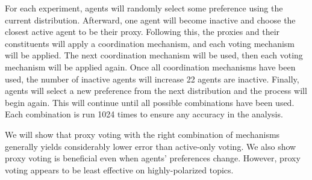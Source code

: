 For each experiment, agents will randomly select some preference using the current
distribution.
Afterward, one agent
will become inactive and choose the closest active agent to be their proxy.
Following this, the proxies and their constituents will apply a coordination
mechanism, and each voting mechanism will be applied.
The next coordination mechanism will be used, then each voting mechanism will be
applied again.
Once all coordination mechanisms have been used, the number of inactive agents will
increase 22 agents are inactive.
Finally, agents will select a new preference from the next distribution and the
process will begin again.
This will continue until all possible combinations have been used.
%
Each combination is run 1024 times to ensure any accuracy in the analysis.

We will show that proxy voting with the right combination of mechanisms generally
yields considerably lower error than active-only voting.
We also show proxy voting is beneficial even when agents' preferences change.
However, proxy voting appears to be least effective on highly-polarized topics.
